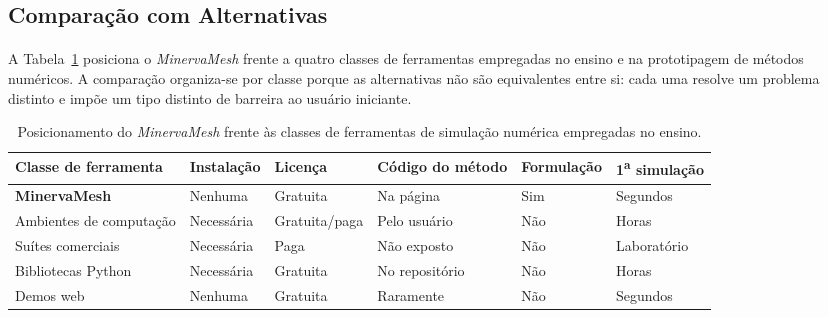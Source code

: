 \subsection{Comparação com Alternativas}
\label{sec:comparacao_alternativas}

\paragraph{}A Tabela~\ref{tab:comparacao_plataformas} posiciona o \textit{MinervaMesh} frente a quatro classes de ferramentas empregadas no ensino e na prototipagem de métodos numéricos. A comparação organiza-se por classe porque as alternativas não são equivalentes entre si: cada uma resolve um problema distinto e impõe um tipo distinto de barreira ao usuário iniciante.

\begin{table}[H]
\centering
\caption{Posicionamento do \textit{MinervaMesh} frente às classes de ferramentas de simulação numérica empregadas no ensino.}
\label{tab:comparacao_plataformas}
\footnotesize
\setlength{\tabcolsep}{3pt}
\renewcommand{\arraystretch}{1.35}
\begin{tabular}{>{\raggedright\arraybackslash}p{3.0cm} >{\raggedright\arraybackslash}p{1.8cm} >{\raggedright\arraybackslash}p{2.3cm} >{\raggedright\arraybackslash}p{2.2cm} >{\raggedright\arraybackslash}p{2.1cm} >{\raggedright\arraybackslash}p{1.8cm}}
\hline
\textbf{Classe de ferramenta} & \textbf{Instalação} & \textbf{Licença} & \textbf{Código do método} & \textbf{Formulação} & \textbf{1\textsuperscript{a} simulação} \\
\hline
\textbf{MinervaMesh}     & Nenhuma    & Gratuita         & Na página      & Sim & Segundos \\
\hline
Ambientes de computação  & Necessária & Gratuita/paga   & Pelo usuário   & Não & Horas \\
\hline
Suítes comerciais        & Necessária & Paga             & Não exposto    & Não & Laboratório \\
\hline
Bibliotecas Python       & Necessária & Gratuita         & No repositório & Não & Horas \\
\hline
Demos web                & Nenhuma    & Gratuita         & Raramente      & Não & Segundos \\
\hline
\end{tabular}
\end{table}

